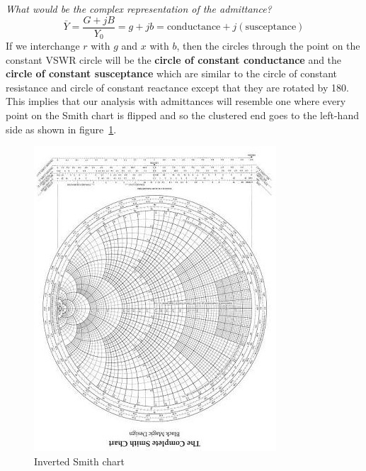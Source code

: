 \emph{What would be the complex representation of the admittance?}
\begin{dmath*}
\bar{Y}=\frac{G + jB}{Y_0} = g + jb
= \text{conductance} + j (\text{susceptance})
\end{dmath*}
If we interchange $r$ with $g$ and $x$ with $b$, then the circles through the point on the constant VSWR circle will be the \textbf{circle of constant conductance} and the \textbf{circle of constant susceptance} which are similar to the circle of constant resistance and circle of constant reactance except that they are rotated by 180\textdegree\;. This implies that our analysis with admittances will resemble one where every point on the Smith chart is flipped and so the clustered end goes to the left-hand side as shown in figure~\ref{fig:invertedsmithchart}.
\begin{figure}[h]
\centering
\includegraphics*[width=0.7\linewidth]{./graphics/smithchart1.jpeg}
\caption{Inverted Smith chart}\label{fig:invertedsmithchart}
\end{figure}

